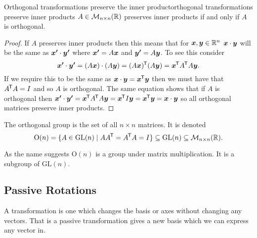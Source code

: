 \documentclass[a4paper]{article}
\newcommand{\nxmMatrices}[3]{\mathcal{M}_{{#1}\times{#2}}({#3})}
\renewcommand{\ident}{I}
\newcommand{\generalLinearGroup}{\mathrm{GL}}
\newcommand{\orthogonalGroup}{\mathrm{O}}
\begin{document}
    \begin{corollary}{Orthogonal transformations preserve the inner product}{orthogonal transformations preserve inner products}
        \(A\in\nxmMatrices{n}{n}{\reals}\) preserves inner products if and only if \(A\) is orthogonal.
    \end{corollary}
    \begin{proof}
        If \(A\) preserves inner products then this means that for \(\bm{x}, \bm{y}\in\mathbb{R}^n\) \(\bm{x}\cdot\bm{y}\) will be the same as \(\bm{x'}\cdot\bm{y'}\) where \(\bm{x'} = A\bm{x}\) and \(\bm{y'} = A\bm{y}\).
        To see this consider
        \[\bm{x'}\cdot\bm{y'} = (A\bm{x})\cdot(A\bm{y}) = (A\bm{x})^{\mkern-1.5mu\mathsf{T}} (A\bm{y}) = \bm{x}^{\mkern-1.5mu\mathsf{T}} A^{\mkern-1.5mu\mathsf{T}} A \bm{y}.\]
        If we require this to be the same as \(\bm{x}\cdot\bm{y} = \bm{x}^{\mkern-1.5mu\mathsf{T}}\bm{y}\) then we must have that \(A\trans A = \ident\) and so \(A\) is orthogonal.
        The same equation shows that if \(A\) is orthogonal then \(\bm{x'}\cdot\bm{y'} = \bm{x}^{\mkern-1.5mu\mathsf{T}} A^{\mkern-1.5mu\mathsf{T}} A \bm{y} = \bm{x}^{\mkern-1.5mu\mathsf{T}} I \bm{y} = \bm{x}^{\mkern-1.5mu\mathsf{T}}\bm{y} = \bm{x}\cdot\bm{y}\) so all orthogonal matrices preserve inner products.
    \end{proof}

    \begin{notation*}{}
        The orthogonal group is the set of all \(n\times n\) matrices.
        It is denoted
        \[\orthogonalGroup(n) = \{A\in\generalLinearGroup(n)\mid AA\trans = A\trans A = I\} \subseteq \generalLinearGroup(n) \subseteq \nxmMatrices{n}{n}{\reals}.\]
    \end{notation*}
    As the name suggests \(\orthogonalGroup(n)\) is a group under matrix multiplication.
    It is a subgroup of \(\generalLinearGroup(n)\).
    
    \subsection{Passive Rotations}
    A  transformation is one which changes the basis or axes without changing any vectors.
    That is a passive transformation gives a new basis which we can express any vector in.
    
\end{document}
